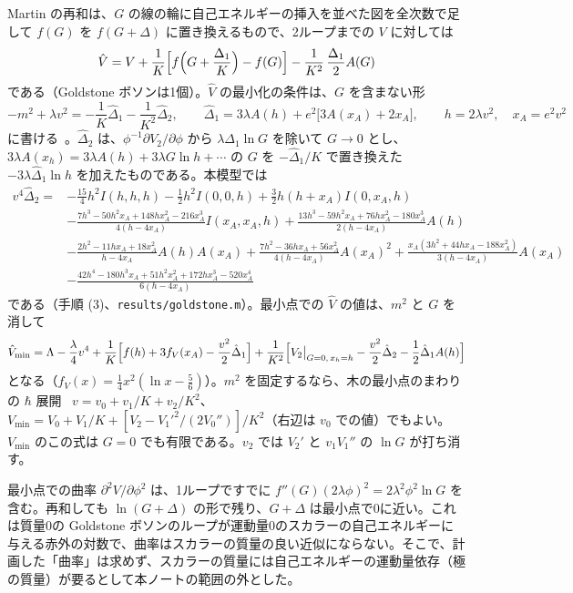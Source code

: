 \documentclass[a4paper,10pt]{ltjsarticle}
\begin{document}
Martin の再和は、$G$ の線の輪に自己エネルギーの挿入を並べた図を全次数で足して $f(G)$ を $f(G+\Delta)$ に置き換えるもので、2ループまでの $V$ に対しては
\begin{equation}
\hat V=V+\frac1K\Bigl[f\Bigl(G+\frac{\Delta_1}K\Bigr)-f(G)\Bigr]-\frac1{K^2}\,\frac{\Delta_1}2A(G)
\label{eq:vhat}
\end{equation}
である（Goldstone ボソンは1個）。$\hat V$ の最小化の条件は、$G$ を含まない形
\begin{equation}
-m^2+\lambda v^2=-\frac1K\hat\Delta_1-\frac1{K^2}\hat\Delta_2,\qquad
\hat\Delta_1=3\lambda A(h)+e^2\bigl[3A(x_A)+2x_A\bigr],\qquad h=2\lambda v^2,\quad x_A=e^2v^2
\label{eq:mincond}
\end{equation}
に書ける~\cite{martin14}。$\hat\Delta_2$ は、$\phi^{-1}\partial V_2/\partial\phi$ から $\lambda\Delta_1\ln G$ を除いて $G\to0$ とし、$3\lambda A(x_h)=3\lambda A(h)+3\lambda G\ln h+\cdots$ の $G$ を $-\hat\Delta_1/K$ で置き換えた $-3\lambda\hat\Delta_1\ln h$ を加えたものである。本模型では
\begin{equation}
\begin{aligned}
v^4\hat\Delta_2={}&-\frac{15}4h^2I(h,h,h)-\frac12h^2I(0,0,h)+\frac32h(h+x_A)I(0,x_A,h)\\
&-\frac{7h^3-50h^2x_A+148hx_A^2-216x_A^3}{4(h-4x_A)}I(x_A,x_A,h)+\frac{13h^3-59h^2x_A+76hx_A^2-180x_A^3}{2(h-4x_A)}A(h)\\
&-\frac{2h^2-11hx_A+18x_A^2}{h-4x_A}A(h)A(x_A)+\frac{7h^2-36hx_A+56x_A^2}{4(h-4x_A)}A(x_A)^2+\frac{x_A(3h^2+44hx_A-188x_A^2)}{3(h-4x_A)}A(x_A)\\
&-\frac{42h^4-180h^3x_A+51h^2x_A^2+172hx_A^3-520x_A^4}{6(h-4x_A)}
\end{aligned}
\label{eq:dh2}
\end{equation}
である（手順 (3)、\texttt{results/goldstone.m}）。最小点での $\hat V$ の値は、$m^2$ と $G$ を消して
\begin{equation}
\hat V_{\min}=\Lambda-\frac\lambda4v^4+\frac1K\Bigl[f(h)+3f_V(x_A)-\frac{v^2}2\hat\Delta_1\Bigr]+\frac1{K^2}\Bigl[V_2\big|_{G=0,\,x_h=h}-\frac{v^2}2\hat\Delta_2-\frac12\hat\Delta_1A(h)\Bigr]
\label{eq:vmin}
\end{equation}
となる（$f_V(x)=\frac14x^2(\ln x-\frac56)$）。$m^2$ を固定するなら、木の最小点のまわりの $\hbar$ 展開~\cite{pr11} $v=v_0+v_1/K+v_2/K^2$、$V_{\min}=V_0+V_1/K+[V_2-V_1'^2/(2V_0'')]/K^2$（右辺は $v_0$ での値）でもよい。$V_{\min}$ のこの式は $G=0$ でも有限である。$v_2$ では $V_2'$ と $v_1V_1''$ の $\ln G$ が打ち消す。

最小点での曲率 $\partial^2V/\partial\phi^2$ は、1ループですでに $f''(G)(2\lambda\phi)^2=2\lambda^2\phi^2\ln G$ を含む。再和しても $\ln(G+\Delta)$ の形で残り、$G+\Delta$ は最小点で0に近い。これは質量0の Goldstone ボソンのループが運動量0のスカラーの自己エネルギーに与える赤外の対数で、曲率はスカラーの質量の良い近似にならない。そこで、計画した「曲率」は求めず、スカラーの質量には自己エネルギーの運動量依存（極の質量）が要るとして本ノートの範囲の外とした。
\end{document}
